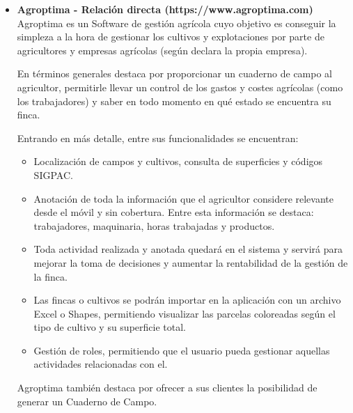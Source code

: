 \begin{itemize}
    \item \textbf{Agroptima - Relación directa (https://www.agroptima.com)}
    \newline
    Agroptima es un Software de gestión agrícola cuyo objetivo es conseguir la simpleza a la hora de gestionar los cultivos
    y explotaciones por parte de agricultores y empresas agrícolas (según declara la propia empresa).

    En términos generales destaca por proporcionar un cuaderno de campo al agricultor, permitirle llevar un control de los 
    gastos y costes agrícolas (como los trabajadores) y saber en todo momento en qué estado se encuentra su finca.

    Entrando en más detalle, entre sus funcionalidades se encuentran:

    \begin{itemize}
        \item Localización de campos y cultivos, consulta de superficies y códigos SIGPAC.
        \item Anotación de toda la información que el agricultor considere relevante desde el móvil y sin cobertura.
        Entre esta información se destaca: trabajadores, maquinaria, horas trabajadas y productos.
        \item Toda actividad realizada y anotada quedará en el sistema y servirá para mejorar la toma de decisiones y 
        aumentar la rentabilidad de la gestión de la finca. 
        \item Las fincas o cultivos se podrán importar en la aplicación con un archivo Excel o Shapes, permitiendo visualizar
        las parcelas coloreadas según el tipo de cultivo y su superficie total.
        \item Gestión de roles, permitiendo que el usuario pueda gestionar aquellas actividades relacionadas con el.
    \end{itemize}

    Agroptima también destaca por ofrecer a sus clientes la posibilidad de generar un Cuaderno de Campo.


\end{itemize}
